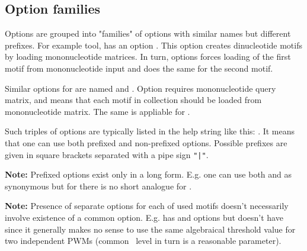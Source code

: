 \subsection{Option families}
{\small

Options are grouped into "families" of options with similar names but different prefixes. For example  tool, has an option . This option creates dinucleotide motifs by loading mononucleotide matrices. In turn,  options forces loading of the first motif from mononucleotide input and  does the same for the second motif.

Similar options for  are named  and . Option  requires mononucleotide query matrix, and  means that each motif in collection should be loaded from mononucleotide matrix. The same is appliable for .

Such triples of options are typically listed in the help string like this: . It means that one can use both prefixed and non-prefixed options. Possible prefixes are given in square brackets separated with a pipe sign \texttt{"|"}.

\textbf{Note:} Prefixed options exist only in a long form. E.g. one can use both  and  as synonymous but for there is no short analogue for .

\textbf{Note:} Presence of separate options for each of used motifs doesn't necessarily involve existence of a common option. E.g.  has  and  options but doesn't have  since it generally makes no sense to use the same algebraical threshold value for two independent PWMs (common \pvalue\ level in turn is a reasonable parameter).
}
